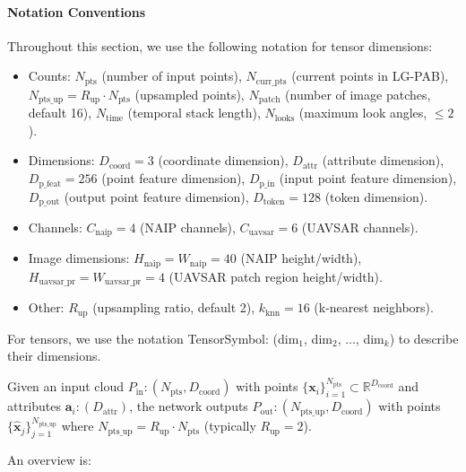 \documentclass[preprints,article,accept,pdftex,moreauthors]{Definitions/mdpi}
\begin{document}
\paragraph{Notation Conventions}
Throughout this section, we use the following notation for tensor dimensions:
\begin{itemize}
    \item Counts: $N_{\text{pts}}$ (number of input points), $N_{\text{curr\_pts}}$ (current points in LG-PAB), $N_{\text{pts\_up}} = R_{\text{up}} \cdot N_{\text{pts}}$ (upsampled points), $N_{\text{patch}}$ (number of image patches, default 16), $N_{\text{time}}$ (temporal stack length), $N_{\text{looks}}$ (maximum look angles, $\leq 2$).
    \item Dimensions: $D_{\text{coord}} = 3$ (coordinate dimension), $D_{\text{attr}}$ (attribute dimension), $D_{\text{p\_feat}} = 256$ (point feature dimension), $D_{\text{p\_in}}$ (input point feature dimension), $D_{\text{p\_out}}$ (output point feature dimension), $D_{\text{token}} = 128$ (token dimension).
    \item Channels: $C_{\text{naip}} = 4$ (NAIP channels), $C_{\text{uavsar}} = 6$ (UAVSAR channels).
    \item Image dimensions: $H_{\text{naip}} = W_{\text{naip}} = 40$ (NAIP height/width), $H_{\text{uavsar\_pr}} = W_{\text{uavsar\_pr}} = 4$ (UAVSAR patch region height/width).
    \item Other: $R_{\text{up}}$ (upsampling ratio, default 2), $k_{\text{knn}} = 16$ (k-nearest neighbors).
\end{itemize}
For tensors, we use the notation TensorSymbol: (dim$_1$, dim$_2$, ..., dim$_k$) to describe their dimensions.

Given an input cloud $P_{\text{in}}: (N_{\text{pts}}, D_{\text{coord}})$ with points $\{\mathbf{x}_i\}_{i=1}^{N_{\text{pts}}}\subset\mathbb{R}^{D_{\text{coord}}}$ and attributes $\mathbf{a}_i: (D_{\text{attr}})$, the network outputs $P_{\text{out}}: (N_{\text{pts\_up}}, D_{\text{coord}})$ with points $\{\hat{\mathbf{x}}_j\}_{j=1}^{N_{\text{pts\_up}}}$ where $N_{\text{pts\_up}} = R_{\text{up}} \cdot N_{\text{pts}}$ (typically $R_{\text{up}} = 2$).

An overview is:
\end{document}
